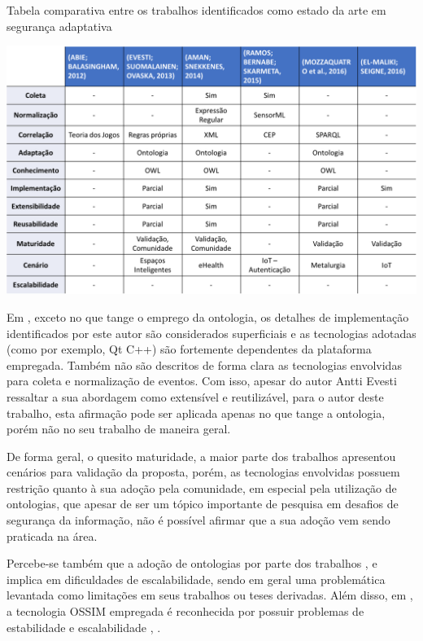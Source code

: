 \documentclass[tid,table]{texufpel} %
\begin{document}
\begin{table}[ht]
\centering
\caption{Tabela comparativa entre os trabalhos identificados como estado da arte em segurança adaptativa}
\includegraphics[width=1.0\textwidth]{imagens/comparacao-estado-da-arte.png}
\label{comparacao-estado-da-arte}
\end{table}

Em \cite{evesti13c}, exceto no que tange o emprego da ontologia, os detalhes de implementação identificados por este autor são considerados superficiais e as tecnologias adotadas (como por exemplo, Qt C++) são fortemente dependentes da plataforma empregada. Também não são descritos de forma clara as tecnologias envolvidas para coleta e normalização de eventos. Com isso, apesar do autor Antti Evesti ressaltar a sua abordagem como extensível e reutilizável, para o autor deste trabalho, esta afirmação pode ser aplicada apenas no que tange a ontologia, porém não no seu trabalho de maneira geral.

De forma geral, o quesito maturidade, a maior parte dos trabalhos apresentou cenários para validação da proposta, porém, as tecnologias envolvidas possuem restrição quanto à sua adoção pela comunidade, em especial pela utilização de ontologias, que apesar de ser um tópico importante de pesquisa em desafios de segurança da informação, não é possível afirmar que a sua adoção vem sendo praticada na área.

Percebe-se também que a adoção de ontologias por parte dos trabalhos \cite{evesti13c}, \cite{aman14} e \cite{mozzaquatro16} implica em dificuldades de escalabilidade, sendo em geral uma problemática levantada como limitações em seus trabalhos ou teses derivadas. Além disso, em \cite{aman14}, a tecnologia OSSIM empregada é reconhecida por possuir problemas de estabilidade e escalabilidade \cite{gartner15}, \cite{infosecnirvana14}.
\end{document}
